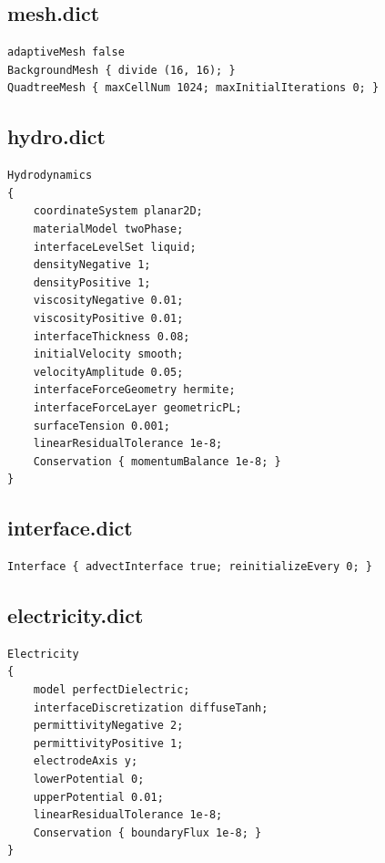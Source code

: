 \documentclass[a4paper,11pt]{article}
\begin{document}
\subsection{mesh.dict}
\begin{lstlisting}
adaptiveMesh false
BackgroundMesh { divide (16, 16); }
QuadtreeMesh { maxCellNum 1024; maxInitialIterations 0; }
\end{lstlisting}
\subsection{hydro.dict}
\begin{lstlisting}
Hydrodynamics
{
    coordinateSystem planar2D;
    materialModel twoPhase;
    interfaceLevelSet liquid;
    densityNegative 1;
    densityPositive 1;
    viscosityNegative 0.01;
    viscosityPositive 0.01;
    interfaceThickness 0.08;
    initialVelocity smooth;
    velocityAmplitude 0.05;
    interfaceForceGeometry hermite;
    interfaceForceLayer geometricPL;
    surfaceTension 0.001;
    linearResidualTolerance 1e-8;
    Conservation { momentumBalance 1e-8; }
}
\end{lstlisting}
\subsection{interface.dict}
\begin{lstlisting}
Interface { advectInterface true; reinitializeEvery 0; }
\end{lstlisting}
\subsection{electricity.dict}
\begin{lstlisting}
Electricity
{
    model perfectDielectric;
    interfaceDiscretization diffuseTanh;
    permittivityNegative 2;
    permittivityPositive 1;
    electrodeAxis y;
    lowerPotential 0;
    upperPotential 0.01;
    linearResidualTolerance 1e-8;
    Conservation { boundaryFlux 1e-8; }
}
\end{lstlisting}
\end{document}
